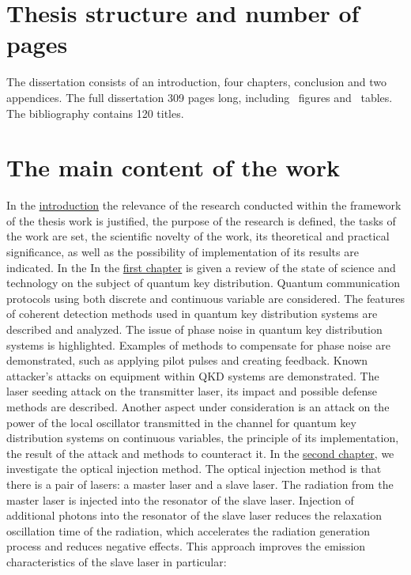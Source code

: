 \section*{Thesis structure and number of pages} The dissertation consists of an introduction, four chapters, conclusion and two appendices. The full dissertation 309 pages long, including \totalfigures\ figures and \totaltables\ tables. The bibliography contains 120 titles.

\section*{The main content of the work}
In the \underline{introduction} the relevance of the research conducted within the framework of the thesis work is justified, the purpose of the research is defined, the tasks of the work are set, the scientific novelty of the work, its theoretical and practical significance, as well as the possibility of implementation of its results are indicated. 
In the \newline In the \underline{first chapter} is given a review of the state of science and technology on the subject of quantum key distribution. Quantum communication protocols using both discrete and continuous variable are considered. The features of coherent detection methods used in quantum key distribution systems are described and analyzed. The issue of phase noise in quantum key distribution systems is highlighted. Examples of methods to compensate for phase noise are demonstrated, such as applying pilot pulses and creating feedback.  Known attacker's attacks on equipment within QKD systems are demonstrated. The laser seeding attack on the transmitter laser, its impact and possible defense methods are described. Another aspect under consideration is an attack on the power of the local oscillator transmitted in the channel for quantum key distribution systems on continuous variables, the principle of its implementation, the result of the attack and methods to counteract it.
\newline In the \underline{second chapter}, we investigate the optical injection method. The optical injection method is that there is a pair of lasers: a master laser and a slave laser. The radiation from the master laser is injected into the resonator of the slave laser. Injection of additional photons into the resonator of the slave laser reduces the relaxation oscillation time of the radiation, which accelerates the radiation generation process and reduces negative effects. This approach improves the emission characteristics of the slave laser in particular:
